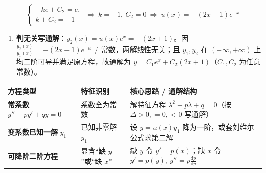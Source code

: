 \documentclass[12pt,a4paper]{ctexart}
\begin{document}
\[
\begin{cases}-ke+C_2=e,\\ k+C_2=-1\end{cases}\ \Longrightarrow\ k=-1,\ C_2=0\ \Longrightarrow\ u(x)=-(2x+1)e^{-x}
\]

\begin{enumerate}

\item \textbf{判无关写通解}：$y_2(x)=u(x)e^x=-(2x+1)$。因 $\frac{y_2(x)}{y_1(x)}=-(2x+1)e^{-x}\neq\text{常数}$，两解线性无关；且 $y_1,y_2$ 在 $(-\infty,+\infty)$ 上均二阶可导并满足原方程，故通解为 \textbf{$y=C_1 e^x + C_2(2x+1)$}（$C_1,C_2$ 为任意常数）。

\end{enumerate}


\begin{center}\small
\begin{tabularx}{\linewidth}{@{}>{\raggedright\arraybackslash}X>{\raggedright\arraybackslash}X>{\raggedright\arraybackslash}X@{}}
\toprule
方程类型 & 特征识别 & 核心思路 / 通解结构 \\
\midrule
\textbf{常系数} $y''+py'+qy=0$ & 系数全为常数 & 解特征方程 $\lambda^2+p\lambda+q=0$（按 $\Delta>0,=0,<0$ 写通解） \\
\textbf{变系数已知一解} $y_1$ & 已知非零解 $y_1$ & 设 $y=u(x)y_1$ 降为一阶，或套刘维尔公式求第二解 \\
\textbf{可降阶二阶方程} & 显含“缺 $y$”或“缺 $x$” & 缺 $y$ 令 $y'=p(x)$；缺 $x$ 令 $y'=p(y),\ y''=p\frac{\mathrm{d}p}{\mathrm{d}y}$ \\
\bottomrule
\end{tabularx}
\end{center}





\end{document}
